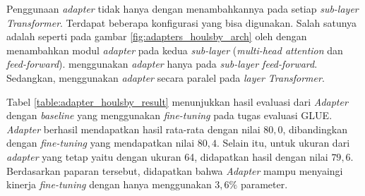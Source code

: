 Penggunaan \textit{adapter} tidak hanya dengan menambahkannya pada setiap \textit{sub-layer Transformer}. Terdapat beberapa konfigurasi yang bisa digunakan. Salah satunya adalah seperti pada gambar \ref{fig:adapters_houlsby_arch} oleh \parencite{adapter_houlsby} dengan menambahkan modul \textit{adapter} pada kedua \textit{sub-layer} (\textit{multi-head attention} dan \textit{feed-forward}). \citeauthor{adapter_pfeiffer} menggunakan \textit{adapter} hanya pada \textit{sub-layer feed-forward}. Sedangkan, \citeauthor{uvpl} menggunakan \textit{adapter} secara paralel pada \textit{layer Transformer}.

\begin{table}[h]
    \vspace{0.25cm}
    \centering
    \caption{Hasil evaluasi \textit{Adapter} konfigurasi \citeauthor{adapter_houlsby} pada GLUE \parencite{adapter_houlsby}}
    \label{table:adapter_houlsby_result}
\end{table}

Tabel \ref{table:adapter_houlsby_result} menunjukkan hasil evaluasi dari \textit{Adapter} dengan \textit{baseline} yang menggunakan \textit{fine-tuning} pada tugas evaluasi GLUE. \textit{Adapter} berhasil mendapatkan hasil rata-rata dengan nilai $80,0$, dibandingkan dengan \textit{fine-tuning} yang mendapatkan nilai $80,4$. Selain itu, untuk ukuran dari \textit{adapter} yang tetap yaitu dengan ukuran 64, didapatkan hasil dengan nilai $79,6$. Berdasarkan paparan tersebut, didapatkan bahwa \textit{Adapter} mampu menyaingi kinerja \textit{fine-tuning} dengan hanya menggunakan $3,6\%$ parameter. 

